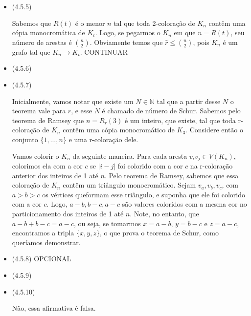 \documentclass{article}
\begin{document}
\begin{itemize}
	\item (4.5.5)

	      Sabemos que \(R(t)\) é o menor \(n\) tal que toda 2-coloração de \(K_n\) contêm uma cópia monocromática de \(K_t\). Logo, se pegarmos o \(K_n\) em que \(n = R(t)\), seu número de arestas é \(\binom{n}{2}\). Obviamente temos que
	      \(\hat{r} \leq \binom{n}{2}\), pois \(K_n\) é um grafo tal que \(K_n \rightarrow K_t\). CONTINUAR

	\item (4.5.6)
	\item (4.5.7)

	      Inicialmente, vamos notar que existe um \(N \in \mathbb{N}\) tal que a partir desse \(N\) o teorema vale para \(r\), e esse \(N\) é chamado de número de
	      Schur. Sabemos pelo teorema de Ramsey que \(n = R_r(3)\) é um inteiro, que existe, tal que
	      toda r-coloração de \(K_n\) contêm uma cópia monocromático de \(K_3\).
	      Considere então o conjunto \(\{1, \dots, n\}\) e uma r-coloração dele.

	      Vamos colorir o \(K_n\) da seguinte maneira. Para cada aresta \(v_iv_j \in V(K_n)\), colorimos ela com a cor \(c\) se \(|i - j|\) foi colorido com a cor
	      \(c\) na r-coloração anterior dos inteiros de 1 até \(n\). Pelo teorema de Ramsey, sabemos que essa coloração de \(K_n\) contêm um triângulo monocromático.
	      Sejam \(v_a, v_b, v_c\), com \(a > b > c\) os vértices queformam esse triângulo, e suponha que ele foi colorido com a cor \(c\). Logo,
	      \(a - b, b - c, a - c\) são valores coloridos com a mesma cor no particionamento dos inteiros de 1 até \(n\). Note, no entanto, que
	      \(a - b + b - c = a - c\), ou seja, se tomarmos \(x = a - b\), \(y = b - c\) e \(z = a - c\), encontramos a tripla \(\{x,y,z\}\), o que prova o
	      teorema de Schur, como queríamos demonstrar.

	\item (4.5.8) OPCIONAL
	\item (4.5.9)
	\item (4.5.10)

	      Não, essa afirmativa é falsa.
\end{itemize}
\end{document}
